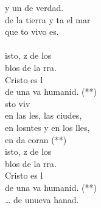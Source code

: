 \begin{cancion}
\begin{chorus}
	y un  de verdad.\\
	de la tierra y ta el mar\\
	que to vivo es. \\
\jump\\
	isto, z de los \\
	blos de la rra.\\
	Cristo es l \\
	de una va humanid. (**)\\
	sto viv\\
	en las les, las ciudes,\\
	en losntes y en los lles,\\
	en da coran (**) \\
	isto, z de los \\
	blos de la rra.\\
	Cristo es l \\
	de una va humanid. (**)\\
	… de unueva hanad.\\
	\end{chorus}%
	\jump\\
\end{cancion}%
